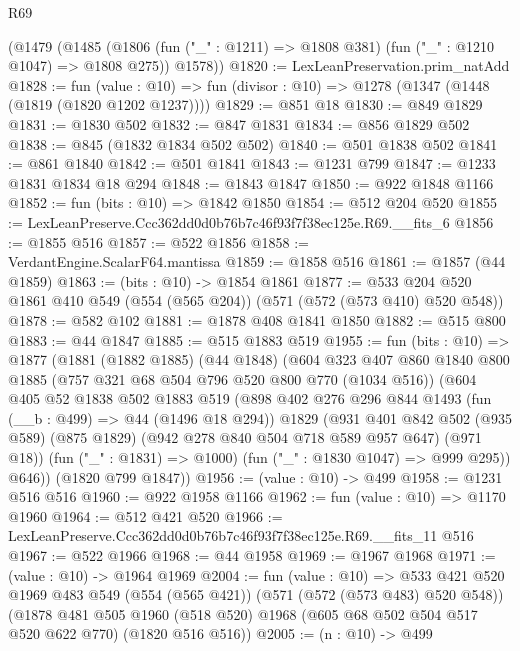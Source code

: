 \begin{lexlean}{R69}
\begin{coremodule}
    (@1479
      (@1485
        (@1806 (fun ("_" : @1211) => @1808 @381) (fun ("_" : @1210 @1047) => @1808 @275))
        @1578))
@1820 := LexLeanPreservation.prim_natAdd
@1828 := fun (value : @10) =>
  fun (divisor : @10) => @1278 (@1347 (@1448 (@1819 (@1820 @1202 @1237))))
@1829 := @851 @18
@1830 := @849 @1829
@1831 := @1830 @502
@1832 := @847 @1831
@1834 := @856 @1829 @502
@1838 := @845 (@1832 @1834 @502 @502)
@1840 := @501 @1838 @502
@1841 := @861 @1840
@1842 := @501 @1841
@1843 := @1231 @799
@1847 := @1233 @1831 @1834 @18 @294
@1848 := @1843 @1847
@1850 := @922 @1848 @1166
@1852 := fun (bits : @10) => @1842 @1850
@1854 := @512 @204 @520
@1855 := LexLeanPreserve.Ccc362dd0d0b76b7c46f93f7f38ec125e.R69.__fits_6
@1856 := @1855 @516
@1857 := @522 @1856
@1858 := VerdantEngine.ScalarF64.mantissa
@1859 := @1858 @516
@1861 := @1857 (@44 @1859)
@1863 := (bits : @10) -> @1854 @1861
@1877 := @533 @204 @520 @1861 @410 @549 (@554 (@565 @204)) (@571 (@572 (@573 @410) @520 @548))
@1878 := @582 @102
@1881 := @1878 @408 @1841 @1850
@1882 := @515 @800
@1883 := @44 @1847
@1885 := @515 @1883 @519
@1955 := fun (bits : @10) =>
  @1877
    (@1881
      (@1882 @1885)
      (@44 @1848)
      (@604
        @323
        @407
        @860
        @1840
        @800
        @1885
        (@757 @321 @68 @504 @796 @520 @800 @770 (@1034 @516))
        (@604
          @405
          @52
          @1838
          @502
          @1883
          @519
          (@898
            @402
            @276
            @296
            @844
            @1493
            (fun (__b : @499) => @44 (@1496 @18 @294))
            @1829
            (@931
              @401
              @842
              @502
              (@935 @589)
              (@875 @1829)
              (@942 @278 @840 @504 @718 @589 @957 @647)
              (@971 @18))
            (fun ("_" : @1831) => @1000)
            (fun ("_" : @1830 @1047) => @999 @295))
          @646))
      (@1820 @799 @1847))
@1956 := (value : @10) -> @499
@1958 := @1231 @516 @516
@1960 := @922 @1958 @1166
@1962 := fun (value : @10) => @1170 @1960
@1964 := @512 @421 @520
@1966 := LexLeanPreserve.Ccc362dd0d0b76b7c46f93f7f38ec125e.R69.__fits_11 @516
@1967 := @522 @1966
@1968 := @44 @1958
@1969 := @1967 @1968
@1971 := (value : @10) -> @1964 @1969
@2004 := fun (value : @10) =>
  @533
    @421
    @520
    @1969
    @483
    @549
    (@554 (@565 @421))
    (@571 (@572 (@573 @483) @520 @548))
    (@1878
      @481
      @505
      @1960
      (@518 @520)
      @1968
      (@605 @68 @502 @504 @517 @520 @622 @770)
      (@1820 @516 @516))
@2005 := (n : @10) -> @499

\end{coremodule}
\end{lexlean}
